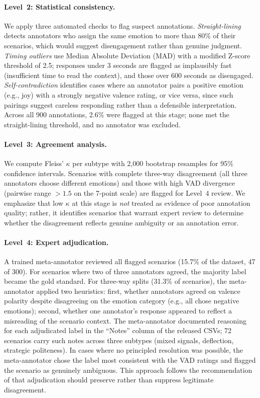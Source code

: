 \documentclass[twoside,11pt]{article}
\begin{document}
\paragraph{Level~2: Statistical consistency.} We apply three automated checks to flag suspect annotations. \textit{Straight-lining} detects annotators who assign the same emotion to more than 80\% of their scenarios, which would suggest disengagement rather than genuine judgment. \textit{Timing outliers} use Median Absolute Deviation (MAD) with a modified Z-score threshold of 2.5; responses under 3 seconds are flagged as implausibly fast (insufficient time to read the context), and those over 600 seconds as disengaged. \textit{Self-contradiction} identifies cases where an annotator pairs a positive emotion (e.g., joy) with a strongly negative valence rating, or vice versa, since such pairings suggest careless responding rather than a defensible interpretation. Across all 900 annotations, 2.6\% were flagged at this stage; none met the straight-lining threshold, and no annotator was excluded.

\paragraph{Level~3: Agreement analysis.} We compute Fleiss' $\kappa$ per subtype with 2,000 bootstrap resamples for 95\% confidence intervals. Scenarios with complete three-way disagreement (all three annotators choose different emotions) and those with high VAD divergence (pairwise range $>1.5$ on the 7-point scale) are flagged for Level~4 review. We emphasize that low $\kappa$ at this stage is \textit{not} treated as evidence of poor annotation quality; rather, it identifies scenarios that warrant expert review to determine whether the disagreement reflects genuine ambiguity or an annotation error.

\paragraph{Level~4: Expert adjudication.} A trained meta-annotator reviewed all flagged scenarios (15.7\% of the dataset, 47 of 300). For scenarios where two of three annotators agreed, the majority label became the gold standard. For three-way splits (31.3\% of scenarios), the meta-annotator applied two heuristics: first, whether annotators agreed on valence polarity despite disagreeing on the emotion category (e.g., all chose negative emotions); second, whether one annotator's response appeared to reflect a misreading of the scenario context. The meta-annotator documented reasoning for each adjudicated label in the ``Notes'' column of the released CSVs; 72 scenarios carry such notes across three subtypes (mixed signals, deflection, strategic politeness). In cases where no principled resolution was possible, the meta-annotator chose the label most consistent with the VAD ratings and flagged the scenario as genuinely ambiguous. This approach follows the recommendation of \citet{passonneau2014benefits} that adjudication should preserve rather than suppress legitimate disagreement.
\end{document}
